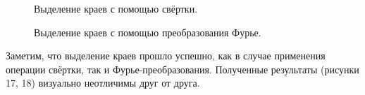 \documentclass[a5paper, 10pt]{article}
\theoremstyle{definition}
\theoremstyle{plain}
\theoremstyle{remark}
\begin{document}
\begin{figure}[h!]
\caption{Выделение краев с помощью свёртки.}
\end{figure}
\begin{figure}[h!]
\caption{Выделение краев с помощью преобразования Фурье.}
\end{figure}

\newpage
Заметим, что выделение краев прошло успешно, как в случае применения операции свёртки, так и Фурье-преобразования. Полученные результаты (рисунки 17, 18) визуально неотличимы друг от друга.
\end{document}
